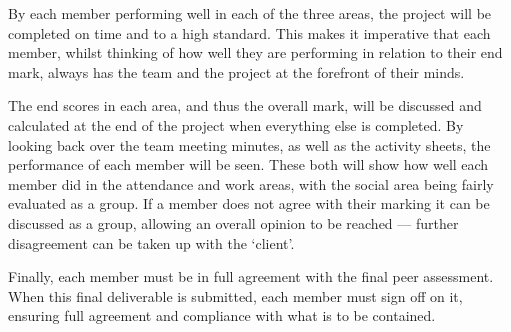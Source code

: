 \documentclass[11pt]{article}
\begin{document}
By each member performing well in each of the three areas, the project will be completed on time and to a high standard. This makes it imperative that each member, whilst thinking of how well they are performing in relation to their end mark, always has the team and the project at the forefront of their minds. 

The end scores in each area, and thus the overall mark, will be discussed and calculated at the end of the project when everything else is completed. By looking back over the team meeting minutes, as well as the activity sheets, the performance of each member will be seen. These both will show how well each member did in the attendance and work areas, with the social area being fairly evaluated as a group. If a member does not agree with their marking it can be discussed as a group, allowing an overall opinion to be reached --- further disagreement can be taken up with the ‘client’. 

Finally, each member must be in full agreement with the final peer assessment. When this final deliverable is submitted, each member must sign off on it, ensuring full agreement and compliance with what is to be contained.  
\end{document}
